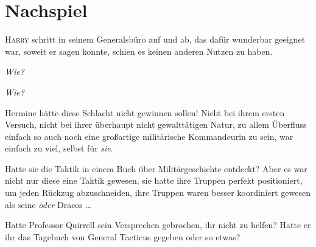 
\section{Nachspiel}

\lettrine{H}{arry} schritt in seinem Generalsbüro auf und ab, das dafür wunderbar geeignet war, soweit er sagen konnte, schien es keinen anderen Nutzen zu haben.

\emph{Wie?}

\emph{Wie?}

Hermine hätte diese Schlacht nicht gewinnen sollen! Nicht bei ihrem ersten Versuch, nicht bei ihrer überhaupt nicht gewalttätigen Natur, zu allem Überfluss einfach so auch noch eine großartige militärische Kommandeurin zu sein, war einfach zu viel, selbst für \emph{sie}.

Hatte sie die Taktik in einem Buch über Militärgeschichte entdeckt? Aber es war nicht nur diese eine Taktik gewesen, sie hatte ihre Truppen perfekt positioniert, um jeden Rückzug abzuschneiden, ihre Truppen waren besser koordiniert gewesen als seine \emph{oder} Dracos …

Hatte Professor Quirrell sein Versprechen gebrochen, ihr nicht zu helfen? Hatte er ihr das Tagebuch von General Tacticus gegeben oder so etwas?%

